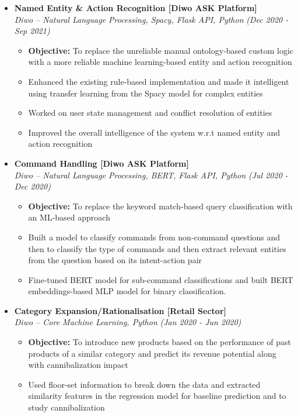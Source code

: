 \documentclass[a4paper,10pt]{article}
\newcommand{\isep}{-2 pt}
\begin{document}
\begin{itemize}
\item \textbf{Named Entity \& Action Recognition [Diwo ASK Platform]}  \\
    \emph{Diwo -- Natural Language Processing, Spacy, Flask API, Python} \hfill {\emph{(Dec 2020 - Sep 2021)}}
    \\[-0.5cm]
    \begin{itemize}\itemsep \isep
        \item \textbf{Objective:} To replace the unreliable manual ontology-based custom logic with a more reliable machine learning-based entity and action recognition  
        \item Enhanced the existing rule-based implementation and made it intelligent using transfer learning from the Spacy model for complex entities 
        \item Worked on user state management and conflict resolution of entities 
        \item Improved the overall intelligence of the system w.r.t named entity and action recognition 
        \\ [-0.5cm]
    \end{itemize}

\item \textbf{Command Handling [Diwo ASK Platform]}  \\
    \emph{Diwo -- Natural Language Processing, BERT, Flask API, Python} \hfill {\emph{(Jul 2020 - Dec 2020)}}
    \\[-0.5cm]
    \begin{itemize}\itemsep \isep
    	\item \textbf{Objective:} To replace the keyword match-based query classification with an ML-based approach
            \item Built a model to classify commands from non-command questions and then to classify the type of commands and then extract relevant entities from the question based on its intent-action pair
            \item Fine-tuned BERT model for sub-command classifications and built BERT embeddings-based MLP model for binary classification.
        \\ [-0.5cm]
    \end{itemize}

\item \textbf{Category Expansion/Rationalisation [Retail Sector]}  \\
    \emph{Diwo -- Core Machine Learning, Python} \hfill {\emph{(Jan 2020 - Jun 2020)}}
    \\[-0.5cm]
    \begin{itemize}\itemsep \isep
    	\item \textbf{Objective:} To introduce new products based on the performance of past products of a similar category and predict its revenue potential along with cannibalization impact
            \item Used floor-set information to break down the data and extracted similarity features in the regression model for baseline prediction and to study cannibalization
        \\ [-0.5cm]
    \end{itemize}


\end{itemize}
\end{document}
